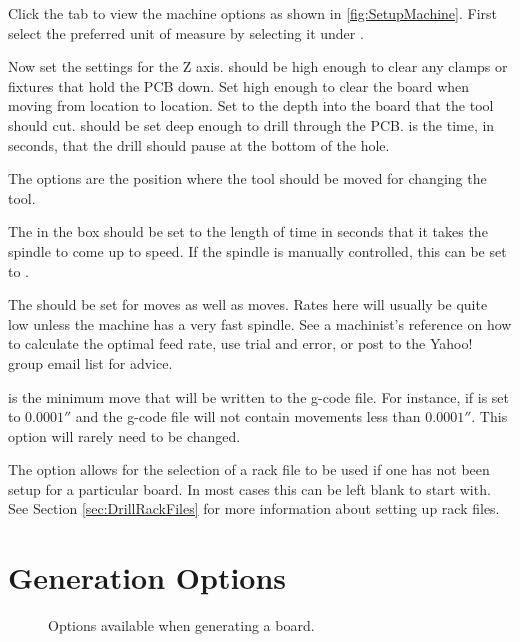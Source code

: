 \documentclass[11pt]{book}
\begin{document}
Click the  tab to view the machine options as shown in \figurename \vref{fig:SetupMachine}. First select the preferred unit of measure by selecting it under . 

Now set the settings for the Z axis.  should be high enough to clear any clamps or fixtures that hold the PCB down. Set  high enough to clear the board when moving from location to location. Set  to the depth into the board that the tool should cut.  should be set deep enough to drill through the PCB.  is the time, in seconds, that the drill should pause at the bottom of the hole.

The  options are the position where the tool should be moved for changing the tool.

The  in the  box should be set to the length of time in seconds that it takes the spindle to come up to speed. If the spindle is manually controlled, this can be set to .

The  should be set for  moves as well as  moves. Rates here will usually be quite low unless the machine has a very fast spindle. See a machinist's reference on how to calculate the optimal feed rate, use trial and error, or post to the Yahoo! group email list for advice.

 is the minimum move that will be written to the g-code file. For instance, if  is set to $0.0001''$ and the g-code file will not contain movements less than $0.0001''$. This option will rarely need to be changed.

The  option allows for the selection of a rack file to be used if one has not been setup for a particular board. In most cases this can be left blank to start with. See Section \vref{sec:DrillRackFiles} for more information about setting up rack files. 

%
%
\section{Generation Options}\label{sec:GenerationOptions}

\begin{figure}
	\caption{Options available when generating a board.}
	\label{fig:SetupGenerationOptions}
\end{figure}
\end{document}
